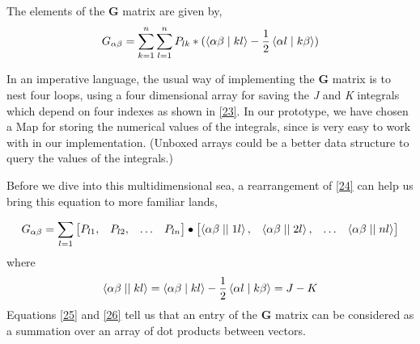 \documentclass{tmr}
\begin{document}
The elements of the  \textbf{G} matrix are given by,
\begin{equation}\label{24}
 G_{\alpha \beta} = \sum^{n}_{k=1}\sum^{n}_{l=1} P_{lk} * 
(\braket{\alpha\beta \mid kl} - \frac{1}{2} \braket{\alpha l \mid k \beta })
\end{equation}

In an imperative language, the usual way of implementing the \textbf{G} matrix
is to nest four loops, using a four dimensional array for saving the \textit{J} and \textit{K}
integrals which depend on four indexes as shown in \eqref{23}.  In our prototype,
we have chosen a Map for storing the numerical values of the integrals, since
is very easy to work with in our implementation. (Unboxed arrays
could be a better data structure to query the values of the integrals.)

\par Before we dive into this multidimensional sea, a rearrangement of \eqref{24} can help us
bring this equation to more familiar lands,

\begin{equation} \label{25}
G_{\alpha \beta} =
\sum_{l=1}
\begin{bmatrix}
 P_{l1}, & P_{l2}, & \hdots & P_{ln} \\
\end{bmatrix}
\bullet
\begin{bmatrix}
\braket{\alpha \beta \mid \mid 1 l}, & \braket{\alpha \beta \mid \mid 2 l}, & 
\hdots & \braket{\alpha \beta \mid \mid n l } \\
\end{bmatrix}
\end{equation}
where 
\begin{equation} \label{26}
\braket{\alpha \beta \mid \mid k l} = 
\braket{\alpha \beta \mid k l} - \frac{1}{2} \braket{\alpha l \mid k \beta} = 
J - K 
\end{equation}
Equations \eqref{25} and \eqref{26} tell us that an entry of the 
\textbf{G} matrix can be considered as a summation over an array of 
dot products between vectors.
\end{document}
